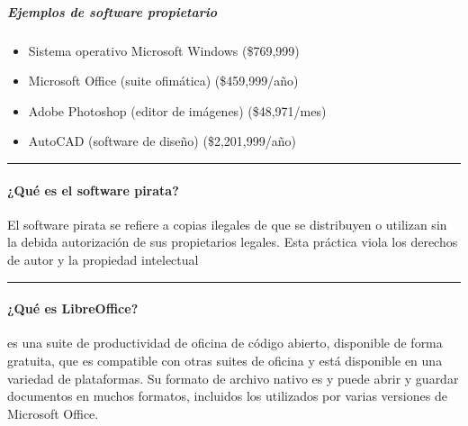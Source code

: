 \documentclass[letterpaper,10pt,spanish]{sphinxmanual}
\begin{document}
\subparagraph{Ejemplos de software propietario}
\label{\detokenize{cursos/ofimatica10/periodo01/R01:ejemplos-de-software-propietario}}\begin{itemize}
\item {} 
\sphinxAtStartPar
Sistema operativo Microsoft Windows (\$769,999)

\item {} 
\sphinxAtStartPar
Microsoft Office (suite ofimática) (\$459,999/año)

\item {} 
\sphinxAtStartPar
Adobe Photoshop (editor de imágenes) (\$48,971/mes)

\item {} 
\sphinxAtStartPar
AutoCAD (software de diseño) (\$2,201,999/año)

\end{itemize}


\bigskip\hrule\bigskip



\paragraph{¿Qué es el software pirata?}
\label{\detokenize{cursos/ofimatica10/periodo01/R01:que-es-el-software-pirata}}
\sphinxAtStartPar
El software pirata se refiere a copias ilegales de  que se distribuyen o utilizan sin la debida autorización de sus propietarios legales. Esta práctica viola los derechos de autor y la propiedad intelectual


\bigskip\hrule\bigskip



\paragraph{¿Qué es LibreOffice?}
\label{\detokenize{cursos/ofimatica10/periodo01/R01:que-es-libreoffice}}
\sphinxAtStartPar
{} es una suite de productividad de oficina de código abierto, disponible de forma gratuita, que es compatible con otras suites de oficina y está disponible en una variedad de plataformas. Su formato de archivo nativo es  y puede abrir y guardar documentos en muchos formatos, incluidos los utilizados por varias versiones de Microsoft Office.
\end{document}
